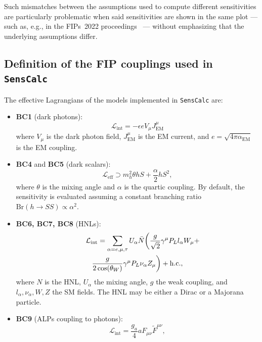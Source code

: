 \documentclass[
    aps,prd,
    twocolumn,
    nofootinbib,
    superscriptaddress,
]{revtex4}
\begin{document}
Such mismatches between the assumptions used to compute different sensitivities are particularly problematic when said sensitivities are shown in the same plot --- such as, e.g., in the FIPs~2022 proceedings~\cite{Antel:2023hkf} --- without emphasizing that the underlying assumptions differ.

\subsection{Definition of the FIP couplings used in \texttt{SensCalc}}

The effective Lagrangians of the models implemented in \texttt{SensCalc} are:
\begin{itemize}
    \item[--] \textbf{BC1} (dark photons):
    \begin{equation}
    \mathcal{L}_{\text{int}} = -\epsilon e V_{\mu}J^{\mu}_{\text{EM}}
    \end{equation}
     where $V_{\mu}$ is the dark photon field, $J_{\text{EM}}^{\mu}$ is the EM current, and $e = \sqrt{4\pi\alpha_{\text{EM}}}$ is the EM coupling.
    \item[--] \textbf{BC4} and \textbf{BC5} (dark scalars): 
    \begin{equation}
        \mathcal{L}_{\text{eff}} \supset m_{h}^{2}\theta hS + \frac{\alpha}{2}hS^{2}, 
    \end{equation}
    where $\theta$ is the mixing angle and $\alpha$ is the quartic coupling. By default, the sensitivity is evaluated assuming a constant branching ratio $\text{Br}(h\to SS) \propto \alpha^{2}$.
    \item[--] \textbf{BC6, BC7, BC8} (HNLs):
    \begin{multline}
       \hspace{1.5em}\mathcal{L}_{\text{int}} = \sum_{\alpha = e,\mu,\tau} U_{\alpha}\bar{N}\biggl(\frac{g}{\sqrt{2}} \gamma^{\mu}P_{L}l_{\alpha} W_{\mu} + \\ \frac{g}{2\cos(\theta_{W})}\gamma^{\mu}P_{L}\nu_{\alpha} Z_{\mu} \biggr)+\text{h.c.},
    \end{multline}
    where $N$ is the HNL, $U_{\alpha}$ the mixing angle, $g$ the weak coupling, and $l_{\alpha},\nu_{\alpha},W,Z$ the SM fields. The HNL may be either a Dirac or a Majorana particle.
    \item[--] \textbf{BC9} (ALPs coupling to photons):
    \begin{equation}
        \mathcal{L}_{\text{int}} = \frac{g_{a}}{4}a F_{\mu\nu}\tilde{F}^{\mu\nu},

\end{equation}
\end{itemize}
\end{document}
